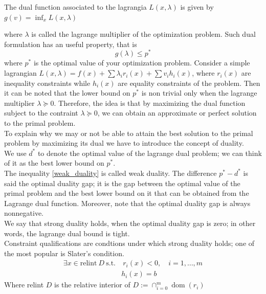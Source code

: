 \begin{definition}
    The dual function associated to the lagrangia $L(x,\lambda)$ is given by $g(v)=\inf_x L(x,\lambda)$
\end{definition}
where $\lambda$ is called the lagrange multiplier of the optimization problem. Such dual formulation has an useful property, that is \begin{equation}\label{weak_duality}
    g(\lambda)\leq p^*
\end{equation}
where $p^*$ is the optimal value of your optimization problem.
Consider a simple lagrangian $L(x,\lambda)=f(x)+\sum \lambda_i r_i(x) +\sum v_i h_i(x)$, where $r_i(x)$ are inequality constraints while $h_i(x)$ are equality constraints of the problem. Then it can be noted that the lower bound on $p^*$ is non trivial only when the lagrange multiplier $\lambda \succeq 0$. Therefore, the idea is that by maximizing the dual function subject to the contraint $\lambda \succeq 0$, we can obtain an approximate or perfect solution to the primal problem.
\\
To explain why we may or not be able to attain the best solution to the primal problem by maximizing its dual we have to introduce the concept of duality.
\\
We use $d^*$ to denote the optimal value of the lagrange dual problem; we can think of it as the best lower bound on $p^*$. 
\\
The inequality \ref{weak_duality} is called weak duality. The difference $p^*-d^*$ is said the optimal duality gap; it is the gap between the optimal value of the primal problem and the best lower bound on it that can be obtained from the Lagrange dual function. Moreover, note that the optimal duality gap is always nonnegative.
\\
We say that strong duality holds, when the optimal duality gap is zero; in other words, the lagrange dual bound is tight.
\\
Constraint qualifications are condtions under which strong duality holds; one of the most popular is Slater's condition.
\begin{equation}\label{slater_condition}
    \begin{aligned}
        \exists x \in \textrm{relint} \ D \ \textrm{s.t.} & \ r_i(x)<0, \quad i=1, \dots, m \\
        & h_i(x)=b
    \end{aligned}
\end{equation}
Where relint $D$ is the relative interior of $ D:=\cap _{i=0}^{m}\operatorname {dom} (r_{i})$
